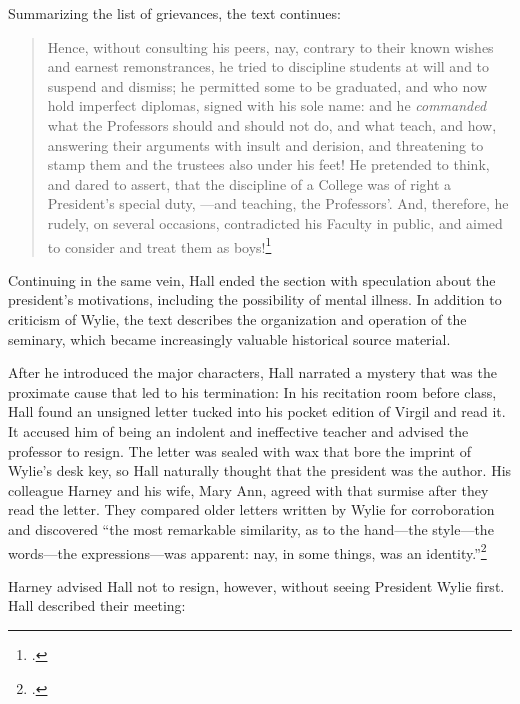 \documentclass[
  american,
  letterpaper,
]{scrreprt}
\begin{document}
Summarizing the list of grievances, the text continues:

\begin{quote}
Hence, without consulting his peers, nay, contrary to their known wishes
and earnest remonstrances, he tried to discipline students at will and
to suspend and dismiss; he permitted some to be graduated, and who now
hold imperfect diplomas, signed with his sole name: and he
\emph{commanded} what the Professors should and should not do, and what
teach, and how, answering their arguments with insult and derision, and
threatening to stamp them and the trustees also under his feet! He
pretended to think, and dared to assert, that the discipline of a
College was of right a President's special duty, ---and teaching, the
Professors'. And, therefore, he rudely, on several occasions,
contradicted his Faculty in public, and aimed to consider and treat them
as boys!\footnote{.}
\end{quote}

Continuing in the same vein, Hall ended the section with speculation
about the president's motivations, including the possibility of mental
illness. In addition to criticism of Wylie, the text describes the
organization and operation of the seminary, which became increasingly
valuable historical source material.

After he introduced the major characters, Hall narrated a mystery that
was the proximate cause that led to his termination: In his recitation
room before class, Hall found an unsigned letter tucked into his pocket
edition of Virgil and read it. It accused him of being an indolent and
ineffective teacher and advised the professor to resign. The letter was
sealed with wax that bore the imprint of Wylie's desk key, so Hall
naturally thought that the president was the author. His colleague
Harney and his wife, Mary Ann, agreed with that surmise after they read
the letter. They compared older letters written by Wylie for
corroboration and discovered ``the most remarkable similarity, as to the
hand---the style---the words---the expressions---was apparent: nay, in
some things, was an identity.''\footnote{.}

Harney advised Hall not to resign, however, without seeing President
Wylie first. Hall described their meeting:
\end{document}
